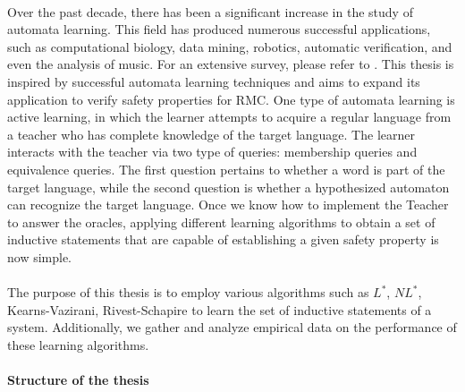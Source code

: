 \paragraph*{}
Over the past decade, there has been a significant increase in the study of automata learning.
This field has produced numerous successful applications, such as 
computational biology, data mining, robotics, automatic verification, and even the analysis of music. 
For an extensive survey, please refer to \cite*{de2005bibliographical}.
This thesis is inspired by successful automata learning techniques and aims to expand its application to verify safety properties for RMC. 
One type of automata learning is active learning, in which the learner attempts to acquire a regular language from a teacher 
who has complete knowledge of the target language.
The learner interacts with the teacher via two type of queries: membership queries and equivalence queries.
The first question pertains to whether a word is part of the target language, 
while the second question is whether a hypothesized automaton can recognize the target language.
Once we know how to implement the Teacher to answer the oracles, 
applying different learning algorithms to obtain a set of inductive statements that are capable of establishing a given safety property is now simple.
\paragraph*{}
The purpose of this thesis is to employ various algorithms such as $L^*$, $NL^*$, Kearns-Vazirani, Rivest-Schapire
to learn the set of inductive statements of a system. 
Additionally, we gather and analyze empirical data on the performance of these learning algorithms.


\paragraph*{Structure of the thesis}
\paragraph*{}

